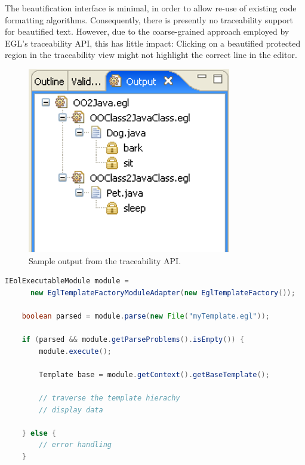 The beautification interface is minimal, in order to allow re-use of existing 
code formatting algorithms. Consequently, there is presently no traceability support 
for beautified text. However, due to the coarse-grained approach employed by 
EGL's traceability API, this has little impact: Clicking on a beautified protected 
region in the traceability view might not highlight the correct line in the editor.

\begin{figure}[htbp]
  \begin{center}
    \leavevmode
    \includegraphics[scale=0.6]{images/TraceView}
  \end{center}
  \caption{Sample output from the traceability API.}
  \label{fig:traceability}
\end{figure}


\begin{lstlisting}[language=Java, basicstyle=\ttfamily\footnotesize, language=EGL, tabsize=2, flexiblecolumns=true, caption=Programmatically accessing the EGL traceability API (in Java)., label=lst:traceability]
	IEolExecutableModule module = 
	  new EglTemplateFactoryModuleAdapter(new EglTemplateFactory());
	
	boolean parsed = module.parse(new File("myTemplate.egl"));
	
	if (parsed && module.getParseProblems().isEmpty()) {
		module.execute();

		Template base = module.getContext().getBaseTemplate();
		
		// traverse the template hierachy
		// display data 
		
	} else {
		// error handling
	}
\end{lstlisting}